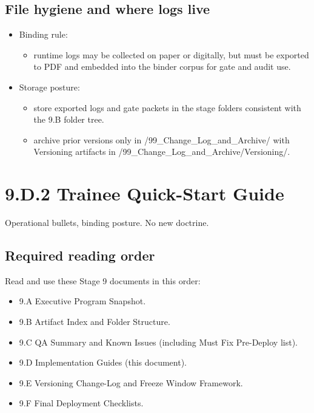 \documentclass[10pt]{article}
\begin{document}
\subsection*{File hygiene and where logs live}
{}

\begin{itemize}
\item Binding rule:
  \begin{itemize}
  \item runtime logs may be collected on paper or digitally, but must be exported to PDF and embedded into the binder corpus for gate and audit use.
  \end{itemize}
\item Storage posture:
  \begin{itemize}
  \item store exported logs and gate packets in the stage folders consistent with the 9.B folder tree.
  \item archive prior versions only in /99\_Change\_Log\_and\_Archive/ with Versioning artifacts in /99\_Change\_Log\_and\_Archive/Versioning/.
  \end{itemize}
\end{itemize}

\newpage

\section*{9.D.2 Trainee Quick-Start Guide}
{}

Operational bullets, binding posture. No new doctrine.

\subsection*{Required reading order}
{}

Read and use these Stage 9 documents in this order:

\begin{itemize}
\item 9.A Executive Program Snapshot.
\item 9.B Artifact Index and Folder Structure.
\item 9.C QA Summary and Known Issues (including Must Fix Pre-Deploy list).
\item 9.D Implementation Guides (this document).
\item 9.E Versioning Change-Log and Freeze Window Framework.
\item 9.F Final Deployment Checklists.
\end{itemize}
\end{document}
